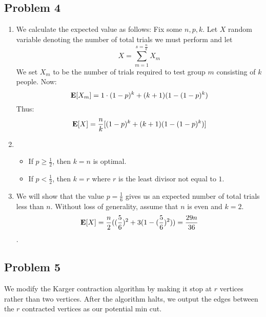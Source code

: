 \documentclass[12pt]{article}%
\begin{document}
\subsection*{Problem 4}
\begin{enumerate}
  \item We calculate the expected value as follows: Fix some $n,p,k$. Let $X$ random variable denoting the number of total trials we must perform and let
  $$X = \sum_{m=1}^{s = \frac{n}{k}} X_m $$
  We set $X_m$ to be the number of trials required to test group $m$ consisting of $k$ people. Now:
  $${\bf E}[X_m] = 1\cdot (1-p)^k + (k+1)(1 - (1-p)^k) $$
  Thus:
  $${\bf E}[X] = \frac{n}{k}[(1-p)^k + (k+1)(1 - (1-p)^k)] $$
  \item
  \begin{itemize}
    \item If $p \geq \frac{1}{2}$, then $k = n$ is optimal.
    \item If $p < \frac{1}{2}$, then $k = r$ where $r$ is the least divisor not equal to $1$.
  \end{itemize}
  \item We will show that the value $p = \frac{1}{6}$ gives us an expected number of total trials less than $n$. Without loss of generality, assume that $n$ is even and $k=2$.
  $$ {\bf E}[X] =  \frac{n}{2}((\frac{5}{6})^2 + 3(1-(\frac{5}{6})^2)) = \frac{29n}{36}$$.
\end{enumerate}

\subsection*{Problem 5}
We modify the Karger contraction algorithm by making it stop at $r$ vertices rather than two vertices. After the algorithm halts, we output the edges between the $r$ contracted vertices as our potential min cut.
\end{document}
